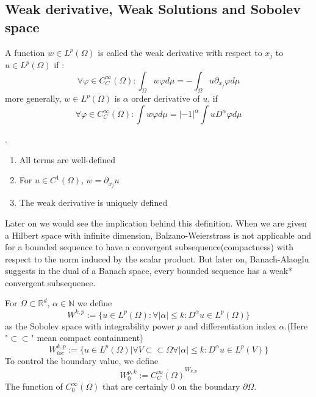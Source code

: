 \subsection{Weak derivative, Weak Solutions and Sobolev space}
\begin{definition}
	A function $w \in L^p(\Omega)$ is called the weak derivative with respect to $x_j$ to $u \in L^p(\Omega)$ if :
	\begin{equation*}
		\forall \varphi \in C^\infty_C(\Omega): \int_\Omega w \varphi d\mu = -\int_\Omega u \partial_{x_j} \varphi d\mu  
	\end{equation*}
	more generally, $w \in L^p(\Omega)$ is $\alpha$ order derivative of $u$, if
	\begin{equation*}
		\forall \varphi \in C^\infty_C(\Omega): \int w \varphi d\mu = |-1|^\alpha \int u D^\alpha \varphi d\mu
	\end{equation*}
\end{definition}

\begin{remark}.
\begin{enumerate}
	\item All terms are well-defined
	\item For $u \in C^1(\Omega)$, $w = \partial_{x_j} u$
	\item The weak derivative is uniquely defined
\end{enumerate}	
\end{remark}

Later on we would see the implication behind this definition. When we are given a Hilbert space with infinite dimension, Balzano-Weierstrass is not applicable and for a bounded sequence to have a convergent subsequence(compactness) with respect to the norm induced by the scalar product. But later on, Banach-Alaoglu suggests in the dual of a Banach space, every bounded sequence has a weak* convergent subsequence.

\begin{definition}
For $\Omega \subset \mathbb{R}^d$, $\alpha \in \mathbb{N}$ we define
\begin{equation*}
	W^{k, p}:= \{u \in L^p(\Omega): \forall |\alpha| \leq k: D^\alpha u \in L^p(\Omega)\}
\end{equation*}
as the Sobolev space with integrability power $p$ and differentiation index $\alpha$.(Here "$\subset \subset$" mean compact containment)
\begin{equation*}
	W^{k, p}_{loc}:= \{ u \in L^p(\Omega)| \forall V \subset \subset \Omega \forall |\alpha| \leq k  :D^\alpha u \in L^p(V) \}
\end{equation*} 
To control the boundary value, we define
\begin{equation*}
	W_0^{p, k}:= \overline{ C_C^\infty(\Omega)}^{W_{k, p}}
\end{equation*}
	The function of $C^\infty_0(\Omega)$ that are certainly 0 on the boundary $\partial \Omega$.
\end{definition}

